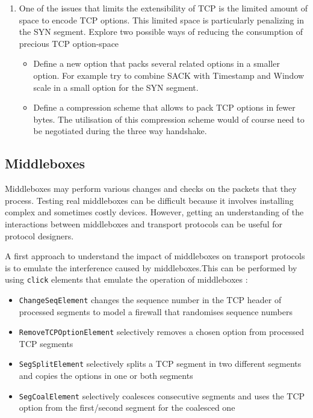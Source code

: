 \begin{enumerate}
\item One of the issues that limits the extensibility of TCP is the limited amount of space to encode TCP options. This limited space is particularly penalizing in the SYN segment. Explore two possible ways of reducing the consumption of precious TCP option-space
\begin{itemize}
\item Define a new option that packs several related options in a smaller option. For example try to combine SACK with Timestamp and Window scale in a small option for the SYN segment. 
\item Define a compression scheme that allows to pack TCP options in fewer bytes. The utilisation of this compression scheme would of course need to be negotiated during the three way handshake.
\end{itemize}



\end{enumerate}

\subsection{Middleboxes}

Middleboxes may perform various changes and checks on the packets that they process.  Testing  real middleboxes can be difficult because it involves installing complex and sometimes costly devices. However, getting an understanding of the interactions between middleboxes and transport protocols can be useful for protocol designers. 

A first approach to understand the impact of middleboxes on transport protocols is to emulate the interference caused by middleboxes.This can be performed by using \texttt{click} \cite{Kohler_click:2000} elements that emulate the operation of middleboxes \cite{Hesmans_click:2013} : 
\begin{itemize}
\item \texttt{ChangeSeqElement} changes the sequence number in the TCP header of processed segments to model a firewall that randomises sequence numbers
\item \texttt{RemoveTCPOptionElement} selectively removes a chosen option from processed TCP segments
\item \texttt{SegSplitElement} selectively splits a TCP segment in two different segments and copies the options in one or both segments
\item \texttt{SegCoalElement} selectively coalesces consecutive segments and uses the TCP option from the first/second segment for the coalesced one
\end{itemize}

